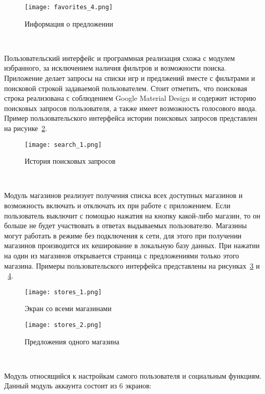 \begin{figure}[H]
 \centering
   \texttt{[image: favorites\_4.png]} 
   \caption{Информация о предложении}
   \label{fig:arch:favorites_4}
\end{figure}


~\par
Пользовательский интерфейс и программная реализация схожа с модулем избранного, за исключением наличия фильтров и возможности поиска. Приложение делает запросы на списки игр и предлжений вместе с фильтрами и поисковой строкой задаваемой пользователем. Стоит отметить, что поисковая строка реализована с соблюдением Google Material Design и содержит историю поисковых запросов пользователя, а также имеет возможность голосового ввода. Пример пользовательского интерфейса истории поисковых запросов представлен на рисунке~\ref{fig:arch:search_1}.

\begin{figure}[H]
 \centering
   \texttt{[image: search\_1.png]} 
   \caption{История поисковых запросов}
   \label{fig:arch:search_1}
\end{figure}

~\par
Модуль магазинов реализует получения списка всех доступных магазинов и возможность включать и отключать их при работе с приложением. Если пользователь выключит с помощью нажатия на кнопку какой-либо магазин, то он больше не будет участвовать в ответах выдываемых пользователю. Магазины могут работать в режиме без подключения к сети, для этого при получении магазинов производится их кеширование в локальную базу данных. При нажатии на один из магазинов открывается страница с предложениями только этого магазина. Примеры пользовательского интерфейса представлены на рисунках~\ref{fig:arch:stores_1} и ~\ref{fig:arch:stores_2}.

\begin{figure}[H]
 \centering
   \texttt{[image: stores\_1.png]} 
   \caption{Экран со всеми магазинами}
   \label{fig:arch:stores_1}
\end{figure}

\begin{figure}[H]
 \centering
   \texttt{[image: stores\_2.png]} 
   \caption{Предложения одного магазина}
   \label{fig:arch:stores_2}
\end{figure}

~\par
Модуль относящийся к настройкам самого пользователя и социальным функциям. Данный модуль аккаунта состоит из 6 экранов:

